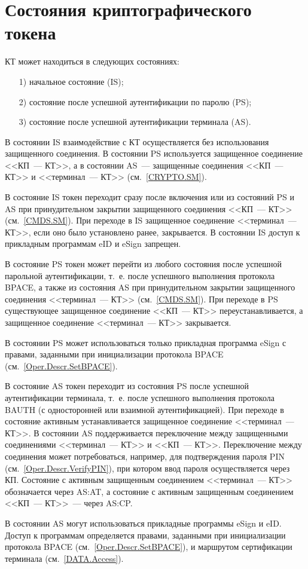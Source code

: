 \chapter{Состояния криптографического токена}\label{STATES}

КТ может находиться в следующих состояниях:
%
\begin{itemize}
\item[1)]
начальное состояние (IS);
\item[2)]
состояние после успешной аутентификации по паролю (PS);
\item[3)]
состояние после успешной аутентификации терминала (AS).
\end{itemize}

В состоянии IS взаимодействие с КТ осуществляется без использования 
защищенного соединения. В состоянии PS используется 
защищенное соединение <<КП~--- КТ>>, 
а в состоянии AS~--- защищенные соединения <<КП~--- КТ>> 
и <<терминал~--- КТ>> (см.~\ref{CRYPTO.SM}).

В состояние IS токен переходит сразу после включения 
или из состояний PS и AS при принудительном закрытии защищенного соединения 
<<КП~--- КТ>> (см.~\ref{CMDS.SM}). 
%
При переходе в IS защищенное соединение <<терминал~--- КТ>>, 
если оно было установлено ранее, закрывается.
В состоянии IS доступ к прикладным программам eID и eSign запрещен.

В состояние PS токен может перейти из любого состояния 
после успешной парольной аутентификации, 
т.~е. после успешного выполнения протокола BPACE,
а также из состояния AS при принудительном закрытии 
защищенного соединения <<терминал~--- КТ>> (см.~\ref{CMDS.SM}).
%
При переходе в PS существующее защищенное соединение <<КП~--- КТ>>  
переустанавливается, а защищенное соединение <<терминал~--- КТ>> 
закрывается.

В состоянии PS может использоваться только прикладная программа eSign
с правами, заданными при инициализации протокола BPACE 
(см.~\ref{Oper.Descr.SetBPACE}).

В состояние AS токен переходит из состояния PS 
после успешной аутентификации терминала, т.~е. 
после успешного выполнения протокола BAUTH 
(с односторонней или взаимной аутентификацией).
%
При переходе в состояние активным устанавливается 
защищенное соединение <<терминал~--- КТ>>.
В состоянии AS поддерживается переключение  
между защищенными соединениями <<терминал~--- КТ>> и <<КП~--- КТ>>.
Переключение между соединения может потребоваться, 
например, для подтверждения пароля PIN (см.~\ref{Oper.Descr.VerifyPIN}), 
при котором ввод пароля осуществляется через КП. 
Состояние с активным защищенным соединением <<терминал~--- КТ>>
обозначается через AS:AT, 
а состояние с активным защищенным соединением <<КП~--- КТ>>~--- 
через AS:CP. 

В состоянии AS могут использоваться прикладные программы eSign и eID.
Доступ к программам определяется правами, 
заданными при инициализации протокола BPACE (см.~\ref{Oper.Descr.SetBPACE}), 
и маршрутом сертификации терминала (см.~\ref{DATA.Access}).


